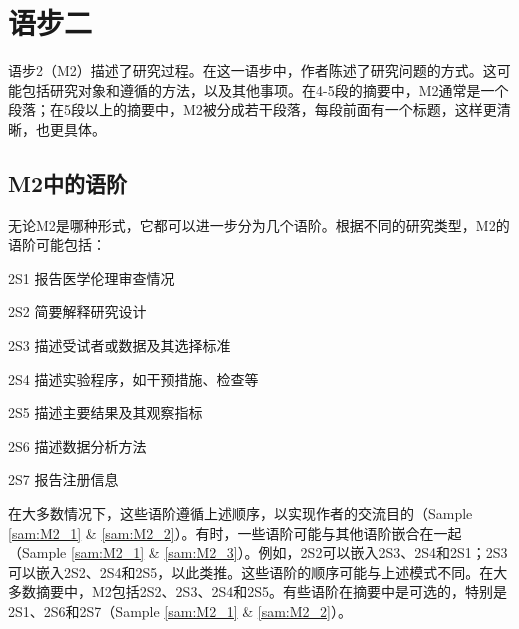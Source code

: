 \documentclass[a4paper]{ctexbook}
\begin{document}
\chapter{语步二}\label{chapter4}

语步2（M2）描述了研究过程。在这一语步中，作者陈述了研究问题的方式。这可能包括研究对象和遵循的方法，以及其他事项。在4-5段的摘要中，M2通常是一个段落；在5段以上的摘要中，M2被分成若干段落，每段前面有一个标题，这样更清晰，也更具体。

\section{M2中的语阶}

无论M2是哪种形式，它都可以进一步分为几个语阶。根据不同的研究类型，M2的语阶可能包括：

2S1 报告医学伦理审查情况

2S2 简要解释研究设计

2S3 描述受试者或数据及其选择标准

2S4 描述实验程序，如干预措施、检查等

2S5 描述主要结果及其观察指标

2S6 描述数据分析方法

2S7 报告注册信息 

在大多数情况下，这些语阶遵循上述顺序，以实现作者的交流目的（Sample \ref{sam:M2_1} \& \ref{sam:M2_2}）。有时，一些语阶可能与其他语阶嵌合在一起（Sample \ref{sam:M2_1} \& \ref{sam:M2_3}）。例如，2S2可以嵌入2S3、2S4和2S1；2S3可以嵌入2S2、2S4和2S5，以此类推。这些语阶的顺序可能与上述模式不同。在大多数摘要中，M2包括2S2、2S3、2S4和2S5。有些语阶在摘要中是可选的，特别是2S1、2S6和2S7（Sample \ref{sam:M2_1} \& \ref{sam:M2_2}）。
\end{document}
